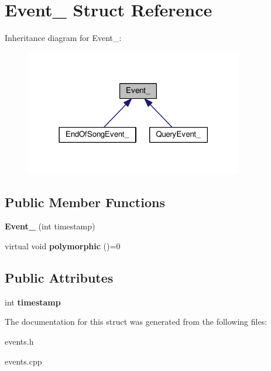 \hypertarget{struct_event__}{}\section{Event\+\_\+ Struct Reference}
\label{struct_event__}


Inheritance diagram for Event\+\_\+\+:
\nopagebreak
\begin{figure}[H]
\begin{center}
\leavevmode
\includegraphics[width=270pt]{struct_event____inherit__graph}
\end{center}
\end{figure}
\subsection*{Public Member Functions}
\begin{DoxyCompactItemize}
\item 
{\bfseries Event\+\_\+} (int timestamp)\hypertarget{struct_event___a480e42487d375d51ffaf8e051ccce162}{}\label{struct_event___a480e42487d375d51ffaf8e051ccce162}

\item 
virtual void {\bfseries polymorphic} ()=0\hypertarget{struct_event___a4330c31a8080eefd1e4824498a492858}{}\label{struct_event___a4330c31a8080eefd1e4824498a492858}

\end{DoxyCompactItemize}
\subsection*{Public Attributes}
\begin{DoxyCompactItemize}
\item 
int {\bfseries timestamp}\hypertarget{struct_event___aa68613c0eac99988b6843cd1bc00cf91}{}\label{struct_event___aa68613c0eac99988b6843cd1bc00cf91}

\end{DoxyCompactItemize}


The documentation for this struct was generated from the following files\+:\begin{DoxyCompactItemize}
\item 
events.\+h\item 
events.\+cpp\end{DoxyCompactItemize}
